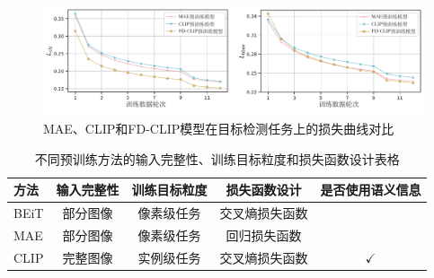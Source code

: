 \begin{figure}
  \centering
  \includegraphics[width=1.0\linewidth]{figures/fd-coco-abl.pdf}
  \caption{MAE、CLIP和FD-CLIP模型在目标检测任务上的损失曲线对比}
  \label{fig:fd-coco-abl}
\end{figure}

\begin{table}
\caption{
不同预训练方法的输入完整性、训练目标粒度和损失函数设计表格}
\centering
  \begin{tabular}{lcccc}
    \toprule
  方法 & 输入完整性 & 训练目标粒度 & 损失函数设计 & 是否使用语义信息 \\
  \midrule
  BEiT & 部分图像 & 像素级任务 & 交叉熵损失函数 & \\ 
  MAE & 部分图像 & 像素级任务 & 回归损失函数 & \\
  \midrule
  CLIP & 完整图像 & 实例级任务 & 交叉熵损失函数 & $\checkmark$  \\
\bottomrule
  \end{tabular}
\label{tab:fd-differences}
\end{table}


